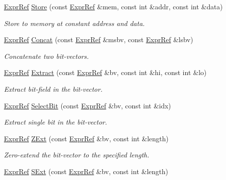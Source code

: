 \begin{DoxyCompactItemize}
\mbox{\hyperlink{classilang_1_1_expr_ref}{Expr\+Ref}} \mbox{\hyperlink{namespaceilang_ab9db91d7f135f2abb8b3aee379850c01}{Store}} (const \mbox{\hyperlink{classilang_1_1_expr_ref}{Expr\+Ref}} \&mem, const int \&addr, const int \&data)
\begin{DoxyCompactList}\small\item\em Store to memory at constant address and data. \end{DoxyCompactList}\item 
\mbox{\hyperlink{classilang_1_1_expr_ref}{Expr\+Ref}} \mbox{\hyperlink{namespaceilang_aa74b423140c9b8a60e1bac56e90ba175}{Concat}} (const \mbox{\hyperlink{classilang_1_1_expr_ref}{Expr\+Ref}} \&msbv, const \mbox{\hyperlink{classilang_1_1_expr_ref}{Expr\+Ref}} \&lsbv)
\begin{DoxyCompactList}\small\item\em Concatenate two bit-\/vectors. \end{DoxyCompactList}\item 
\mbox{\hyperlink{classilang_1_1_expr_ref}{Expr\+Ref}} \mbox{\hyperlink{namespaceilang_ab73a95aa5988d50567c5ff6fe53de913}{Extract}} (const \mbox{\hyperlink{classilang_1_1_expr_ref}{Expr\+Ref}} \&bv, const int \&hi, const int \&lo)
\begin{DoxyCompactList}\small\item\em Extract bit-\/field in the bit-\/vector. \end{DoxyCompactList}\item 
\mbox{\hyperlink{classilang_1_1_expr_ref}{Expr\+Ref}} \mbox{\hyperlink{namespaceilang_a28a510ed3c6bbe8cb314bdfb8d664283}{Select\+Bit}} (const \mbox{\hyperlink{classilang_1_1_expr_ref}{Expr\+Ref}} \&bv, const int \&idx)
\begin{DoxyCompactList}\small\item\em Extract single bit in the bit-\/vector. \end{DoxyCompactList}\item 
\mbox{\hyperlink{classilang_1_1_expr_ref}{Expr\+Ref}} \mbox{\hyperlink{namespaceilang_ad992886a38803601f88f987b174f4c34}{Z\+Ext}} (const \mbox{\hyperlink{classilang_1_1_expr_ref}{Expr\+Ref}} \&bv, const int \&length)
\begin{DoxyCompactList}\small\item\em Zero-\/extend the bit-\/vector to the specified length. \end{DoxyCompactList}\item 
\mbox{\hyperlink{classilang_1_1_expr_ref}{Expr\+Ref}} \mbox{\hyperlink{namespaceilang_ae0a2da11f53d77bc38c204c87f6eecda}{S\+Ext}} (const \mbox{\hyperlink{classilang_1_1_expr_ref}{Expr\+Ref}} \&bv, const int \&length)

\end{DoxyCompactItemize}
